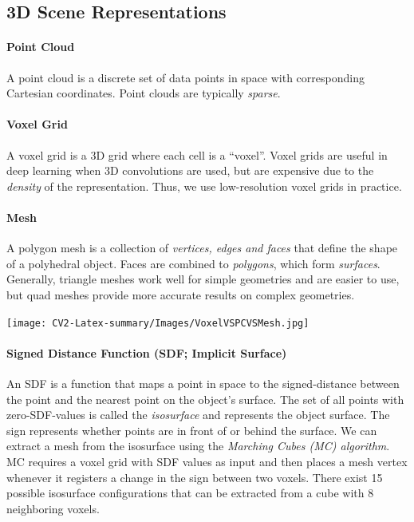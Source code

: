 \documentclass[oneside,fontsize=11pt,paper=a4]{scrartcl}
\begin{document}
\begin{multicols}{2}
\subsection{3D Scene Representations}

\paragraph{Point Cloud} A point cloud is a discrete set of data points in space with corresponding Cartesian coordinates. Point clouds are typically \textit{sparse}.

\paragraph{Voxel Grid} A voxel grid is a 3D grid where each cell is a ``voxel''. Voxel grids are useful in deep learning when 3D convolutions are used, but are expensive due to the \textit{density} of the representation. Thus, we use low-resolution voxel grids in practice.

\paragraph{Mesh} A polygon mesh is a collection of \textit{vertices, edges and faces} that define the shape of a polyhedral object. Faces are combined to \textit{polygons}, which  form \textit{surfaces}. Generally, triangle meshes work well for simple geometries and are easier to use, but quad meshes provide more accurate results on complex geometries.

\texttt{[image: CV2-Latex-summary/Images/VoxelVSPCVSMesh.jpg]}

\paragraph{Signed Distance Function (SDF; Implicit Surface)} An SDF is a function that maps a point in space to the signed-distance between the point and the nearest point on the object's surface. The set of all points with zero-SDF-values is called the \textit{isosurface} and represents the object surface. The sign represents whether points are in front of or behind the surface. We can extract a mesh from the isosurface using the \textit{Marching Cubes (MC) algorithm}. MC requires a voxel grid with SDF values as input and then places a mesh vertex whenever it registers a change in the sign between two voxels. There exist 15 possible isosurface configurations that can be extracted from a cube with 8 neighboring voxels.


\end{multicols}
\end{document}
